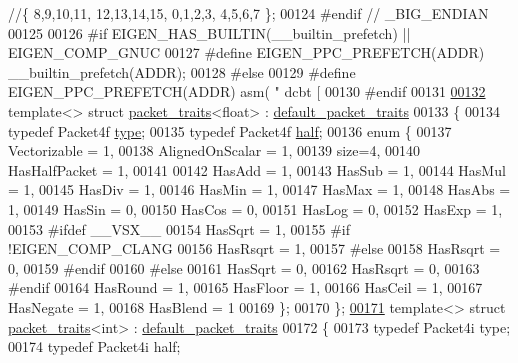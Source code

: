 \begin{DoxyCode}
                             \textcolor{comment}{//\{ 8,9,10,11, 12,13,14,15, 0,1,2,3, 4,5,6,7 \};}
00124 \textcolor{preprocessor}{#endif // \_BIG\_ENDIAN}
00125 
00126 \textcolor{preprocessor}{#if EIGEN\_HAS\_BUILTIN(\_\_builtin\_prefetch) || EIGEN\_COMP\_GNUC}
00127 \textcolor{preprocessor}{  #define EIGEN\_PPC\_PREFETCH(ADDR) \_\_builtin\_prefetch(ADDR);}
00128 \textcolor{preprocessor}{#else}
00129 \textcolor{preprocessor}{  #define EIGEN\_PPC\_PREFETCH(ADDR) asm( "   dcbt [%
00130 \textcolor{preprocessor}{#endif}
00131 
\hyperlink{struct_eigen_1_1internal_1_1packet__traits_3_01float_01_4}{00132} \textcolor{keyword}{template}<> \textcolor{keyword}{struct }\hyperlink{struct_eigen_1_1internal_1_1packet__traits}{packet\_traits}<float>  : \hyperlink{struct_eigen_1_1internal_1_1default__packet__traits}{default\_packet\_traits}
00133 \{
00134   \textcolor{keyword}{typedef} Packet4f \hyperlink{struct_eigen_1_1internal_1_1_packet4f}{type};
00135   \textcolor{keyword}{typedef} Packet4f \hyperlink{struct_eigen_1_1internal_1_1_packet4f}{half};
00136   \textcolor{keyword}{enum} \{
00137     Vectorizable = 1,
00138     AlignedOnScalar = 1,
00139     size=4,
00140     HasHalfPacket = 1,
00141 
00142     HasAdd  = 1,
00143     HasSub  = 1,
00144     HasMul  = 1,
00145     HasDiv  = 1,
00146     HasMin  = 1,
00147     HasMax  = 1,
00148     HasAbs  = 1,
00149     HasSin  = 0,
00150     HasCos  = 0,
00151     HasLog  = 0,
00152     HasExp  = 1,
00153 \textcolor{preprocessor}{#ifdef \_\_VSX\_\_}
00154     HasSqrt = 1,
00155 \textcolor{preprocessor}{#if !EIGEN\_COMP\_CLANG}
00156     HasRsqrt = 1,
00157 \textcolor{preprocessor}{#else}
00158     HasRsqrt = 0,
00159 \textcolor{preprocessor}{#endif}
00160 \textcolor{preprocessor}{#else}
00161     HasSqrt = 0,
00162     HasRsqrt = 0,
00163 \textcolor{preprocessor}{#endif}
00164     HasRound = 1,
00165     HasFloor = 1,
00166     HasCeil = 1,
00167     HasNegate = 1,
00168     HasBlend = 1
00169   \};
00170 \};
\hyperlink{struct_eigen_1_1internal_1_1packet__traits_3_01int_01_4}{00171} \textcolor{keyword}{template}<> \textcolor{keyword}{struct }\hyperlink{struct_eigen_1_1internal_1_1packet__traits}{packet\_traits}<int>    : \hyperlink{struct_eigen_1_1internal_1_1default__packet__traits}{default\_packet\_traits}
00172 \{
00173   \textcolor{keyword}{typedef} Packet4i type;
00174   \textcolor{keyword}{typedef} Packet4i half;
}
\end{DoxyCode}
